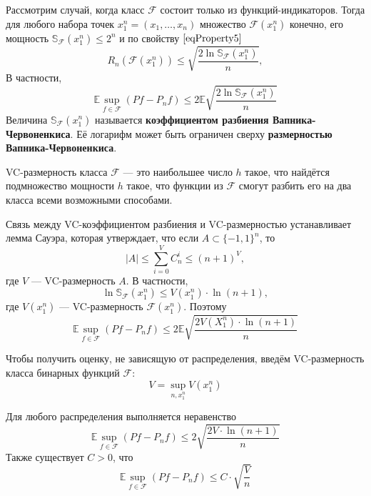 \documentclass[12pt]{article}
\newtheorem{theorem}{\hskip\parindent Теорема}%
\begin{document}
Рассмотрим случай, когда класс $\mathcal{F}$ состоит только из функций-индикаторов. Тогда для любого набора точек $x_1^n=(x_1,\dots,x_n)$ множество $\mathcal{F}(x_1^n)$ конечно, его мощность $\mathbb{S}_{\mathcal{F}}(x_1^n)\leqslant2^n$ и по свойству $\eqref{eqProperty5}$
\begin{equation}\label{eqRademacherVCInequality}
	R_n(\mathcal{F}(x_1^n))\leqslant\sqrt{\frac{2\ln\mathbb{S}_{\mathcal{F}}(x_1^n)}{n}},
\end{equation}
В частности,
\begin{equation*}
	\mathbb{E}\sup\limits_{f\in\mathcal{F}}(Pf-P_nf)\leqslant2\mathbb{E}\sqrt{\frac{2\ln\mathbb{S}_{\mathcal{F}}(x_1^n)}{n}}
\end{equation*}
Величина $\mathbb{S}_{\mathcal{F}}(x_1^n)$ называется \textbf{коэффициентом разбиения Вапника-Червоненкиса}. Её логарифм может быть ограничен сверху \textbf{размерностью Вапника-Червоненкиса}.

VC-размерность класса $\mathcal{F}$ --- это наибольшее число $h$ такое, что найдётся подмножество мощности $h$ такое, что функции из $\mathcal{F}$ смогут разбить его на два класса всеми возможными способами.

Связь между VC-коэффициентом разбиения и VC-размерностью устанавливает лемма Сауэра, которая утверждает, что если $A\subset\{-1,1\}^n$, то
\begin{equation*}
	|A|\leqslant\sum\limits_{i=0}^{V}C_n^i\leqslant(n+1)^V,
\end{equation*}
где $V$ --- VC-размерность $A$. В частности,
\begin{equation*}
	\ln\mathbb{S}_{\mathcal{F}}(x_1^n)\leqslant V(x_1^n)\cdot\ln(n+1),
\end{equation*}
где $V(x_1^n)$ --- VC-размерность $\mathcal{F}(x_1^n)$. Поэтому
\begin{equation*}
	\mathbb{E}\sup\limits_{f\in\mathcal{F}}(Pf-P_nf)\leqslant2\mathbb{E}\sqrt{\frac{2V(X_1^n)\cdot\ln(n+1)}{n}}
\end{equation*}

Чтобы получить оценку, не зависящую от распределения, введём VC-размерность класса бинарных функций $\mathcal{F}$:
\begin{equation*}
	V=\sup\limits_{n,x_1^n}V(x_1^n)
\end{equation*}
\begin{theorem}
	Для любого распределения выполняется неравенство
	\begin{equation*}
		\mathbb{E}\sup\limits_{f\in\mathcal{F}}(Pf-P_nf)\leqslant2\sqrt{\frac{2V\cdot\ln(n+1)}{n}}
	\end{equation*}
	Также существует $C>0$, что
	\begin{equation*}
		\mathbb{E}\sup\limits_{f\in\mathcal{F}}(Pf-P_nf)\leqslant C\cdot\sqrt{\frac{V}{n}}
	\end{equation*}
\end{theorem}
\end{document}
